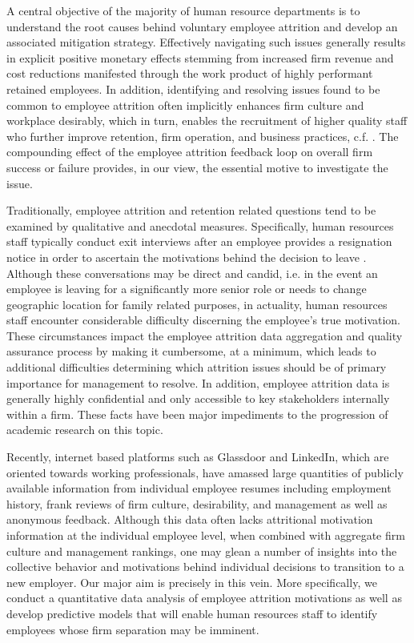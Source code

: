 \documentclass[10pt]{article}
\begin{document}
A central objective of the majority of human resource departments is to understand the root causes 
behind voluntary employee attrition and develop an associated mitigation strategy.  Effectively 
navigating such issues generally results in explicit positive monetary effects stemming from increased 
firm revenue and cost reductions manifested through the work product of highly performant retained employees. 
In addition, identifying and resolving issues found to be common to employee attrition often implicitly 
enhances firm culture and workplace desirably, which in turn, enables the recruitment of higher quality 
staff who further improve retention, firm operation, and business practices, c.f.  \cite{Cook1986,Free1994}.  
The compounding effect of the employee attrition feedback loop on overall firm
success or failure provides, in our view, the essential motive to 
investigate the issue. 

Traditionally, employee attrition and retention related questions tend to be examined by qualitative and anecdotal 
measures.  Specifically, human resources staff typically conduct exit interviews after an employee provides 
a resignation notice in order to ascertain the motivations behind the decision to leave \cite{Giac1991}.  Although 
these conversations may be direct and candid, i.e. in the event an employee is leaving for a significantly 
more senior role or needs to change geographic location for family related purposes, in actuality, human resources staff
encounter considerable difficulty discerning the employee's true motivation.  
These circumstances impact the employee attrition data aggregation and quality assurance process 
by making it cumbersome, at a minimum, which leads to additional difficulties determining which 
attrition issues should be of primary importance for management to resolve. In addition, employee 
attrition data is generally highly confidential and only accessible to key stakeholders internally 
within a firm.  These facts have been major impediments to the progression of academic research on 
this topic. 

Recently, internet based platforms such as Glassdoor and LinkedIn, which are oriented towards working 
professionals, have amassed large quantities of publicly available information from individual 
employee resumes including employment history, frank reviews of firm culture, desirability, and management
as well as anonymous feedback.  Although this data often lacks attritional motivation information at 
the individual employee level, when combined with aggregate firm culture and management rankings, 
one may glean a number of insights into the collective behavior and motivations behind individual 
decisions to transition to a new employer. Our major aim is precisely in this vein.  More specifically, 
we conduct a quantitative data analysis of employee attrition motivations as well as develop 
predictive models that will enable human resources staff to identify employees whose firm separation 
may be imminent.
\end{document}

